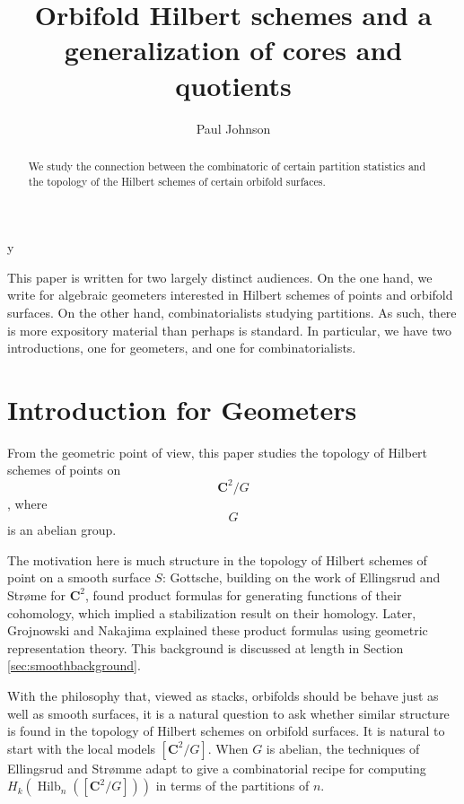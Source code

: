 y\documentclass{amsart}[12pt]
\theoremstyle{definition}
\newcommand{\C}{\mathbf{C}}
\DeclareMathOperator{\Hilb}{Hilb}
\begin{document}
\begin{abstract}
We study the connection between the combinatoric of certain partition statistics and the topology of the Hilbert schemes of certain orbifold surfaces.
\end{abstract}


\title{Orbifold Hilbert schemes and a generalization of cores and quotients}


\author{Paul Johnson}
\address{University of Sheffield}


\maketitle
\setcounter{tocdepth}{1}
\tableofcontents
This paper is written for two largely distinct audiences.  On the one hand, we write for algebraic geometers interested in Hilbert schemes of points and orbifold surfaces.  On the other hand, combinatorialists studying partitions.  As such, there is more expository material than perhaps is standard.  In particular, we have two introductions, one for geometers, and one for combinatorialists.


\section{Introduction for Geometers}
\cite{GLMpower}

From the geometric point of view, this paper studies the topology of Hilbert schemes of points on $$\C^2/G$$, where $$G$$ is an abelian group.  

The motivation here is much structure in the topology of Hilbert schemes of point on a smooth surface $S$: Gottsche, building on the work of Ellingsrud and Str\o me for $\C^2$, found product formulas for generating functions of their cohomology, which implied a stabilization result on their homology.  Later, Grojnowski and Nakajima \cite{grojnowski, nakajimaheisenberg} explained these product formulas using geometric representation theory.  This background is discussed at length in Section \ref{sec:smoothbackground}.

With the philosophy that, viewed as stacks, orbifolds should be behave just as well as smooth surfaces, it is a natural question to ask whether similar structure is found in the topology of Hilbert schemes on orbifold surfaces.  It is natural to start with the local models $[\C^2/G]$.  When $G$ is abelian, the techniques of Ellingsrud and Str\o mme adapt to give a combinatorial recipe for computing $H_k(\Hilb_n([\C^2/G]))$ in terms of the partitions of $n$.
\end{document}
